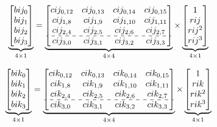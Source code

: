 \documentclass[12pt]{article}
\begin{document}
{\large
$$
\underbrace{\begin{bmatrix}
bij_0 \\
bij_1 \\
bij_2\\
bij_3
\end{bmatrix}}_{4\times 1}
=
\underbrace{\begin{bmatrix}
cij_{0,12} & cij_{0,13} & cij_{0,14} & cij_{0,15} \\
cij_{1,8 } & cij_{1,9 } & cij_{1,10} & cij_{1,11}\\
cij_{2,4 } & cij_{2,5 } & cij_{2,6 } & cij_{2,7 }\\
\hdashline
cij_{3,0 } & cij_{3,1 } & cij_{3,2 } & cij_{3,3 }
\end{bmatrix}}_{4\times 4}
\times
\underbrace{\begin{bmatrix}
1 \\
rij \\
rij^2\\
rij^3
\end{bmatrix}}_{4\times 1}
$$

\clearpage

$$
\underbrace{\begin{bmatrix}
bik_0 \\
bik_1 \\
bik_2\\
bik_3
\end{bmatrix}}_{4\times 1}
=
\underbrace{\begin{bmatrix}
cik_{0,12} & cik_{0,13} & cik_{0,14} & cik_{0,15} \\
cik_{1,8 } & cik_{1,9 } & cik_{1,10} & cik_{1,11}\\
cik_{2,4 } & cik_{2,5 } & cik_{2,6 } & cik_{2,7 }\\
\hdashline
cik_{3,0 } & cik_{3,1 } & cik_{3,2 } & cik_{3,3 }
\end{bmatrix}}_{4\times 4}
\times
\underbrace{\begin{bmatrix}
1 \\
rik \\
rik^2\\
rik^3
\end{bmatrix}}_{4\times 1}
$$

\clearpage

}
\end{document}
